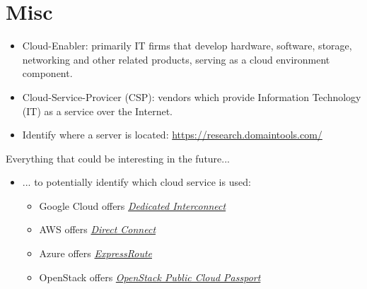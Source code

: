 \documentclass[12pt]{article}
\begin{document}
\newpage
\section*{Misc}
\begin{itemize}
    \item Cloud-Enabler: primarily IT firms that develop hardware, software, storage, networking and other related products, serving as a cloud environment component.
    \item Cloud-Service-Provicer (CSP): vendors which provide Information Technology (IT) as a service over the Internet.
    \item Identify where a server is located: \url{https://research.domaintools.com/}
\end{itemize}
Everything that could be interesting in the future... 
\begin{itemize}
    \item ... to potentially identify which cloud service is used:
    \begin{itemize}
    \item Google Cloud offers \href{https://cloud.google.com/interconnect/docs/concepts/dedicated-overview}{\textit{Dedicated Interconnect}}
    \item AWS offers \href{https://aws.amazon.com/directconnect/}{\textit{Direct Connect}}
    \item Azure offers \href{https://azure.microsoft.com/en-us/services/expressroute/}{\textit{ExpressRoute}}
    \item OpenStack offers \href{https://www.openstack.org/passport/}{\textit{OpenStack Public Cloud Passport}}
\end{itemize}
\end{itemize}
\end{document}
